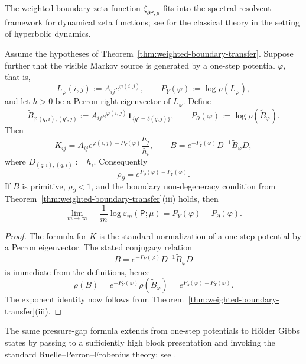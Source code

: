 \begin{remark}
The weighted boundary zeta function
\(\zeta_{\partial\mathsf{P},\mu}\) fits into the spectral-resolvent
framework for dynamical zeta functions; see
\citet{ParryPollicott1990} for the classical theory in the setting of
hyperbolic dynamics.
\end{remark}

\begin{corollary}
\label{cor:pressure-gap}
Assume the hypotheses of
Theorem~\ref{thm:weighted-boundary-transfer}.  Suppose further that the
visible Markov source is generated by a one-step potential \(\varphi\),
that is,
\[
  L_\varphi(i,j):=A_{ij}e^{\varphi(i,j)},
  \qquad
  P_Y(\varphi):=\log\rho(L_\varphi),
\]
and let \(h>0\) be a Perron right eigenvector of \(L_\varphi\).  Define
\[
  \widetilde B_\varphi{}_{(q,i),(q',j)}
  := A_{ij}e^{\varphi(i,j)}
     \mathbf{1}_{\{q'=\delta(q,j)\}},
  \qquad
  P_\partial(\varphi):=\log\rho(\widetilde B_\varphi).
\]
Then
\[
  K_{ij}
  = A_{ij}e^{\varphi(i,j)-P_Y(\varphi)}\frac{h_j}{h_i},
  \qquad
  B = e^{-P_Y(\varphi)}D^{-1}\widetilde B_\varphi D,
\]
where \(D_{(q,i),(q,i)}:=h_i\).  Consequently
\[
  \rho_\partial
  = e^{P_\partial(\varphi)-P_Y(\varphi)}.
\]
If \(B\) is primitive, \(\rho_\partial<1\), and the boundary
non-degeneracy condition from
Theorem~\ref{thm:weighted-boundary-transfer}(iii) holds, then
\[
  \lim_{m\to\infty}
  -\frac{1}{m}\log \varepsilon_m(\mathsf{P};\mu)
  = P_Y(\varphi)-P_\partial(\varphi).
\]
\end{corollary}

\begin{proof}
The formula for \(K\) is the standard normalization of a one-step
potential by a Perron eigenvector.  The stated conjugacy relation
\[
  B = e^{-P_Y(\varphi)}D^{-1}\widetilde B_\varphi D
\]
is immediate from the definitions, hence
\[
  \rho(B)=e^{-P_Y(\varphi)}\rho(\widetilde B_\varphi)
  = e^{P_\partial(\varphi)-P_Y(\varphi)}.
\]
The exponent identity now follows from
Theorem~\ref{thm:weighted-boundary-transfer}(iii).
\end{proof}

\begin{remark}
The same pressure-gap formula extends from one-step potentials to
H\"older Gibbs states by passing to a sufficiently high block
presentation and invoking the standard Ruelle--Perron--Frobenius theory;
see \citet{Bowen2008,Ruelle1978,Walters1975GMeasures}.
\end{remark}
